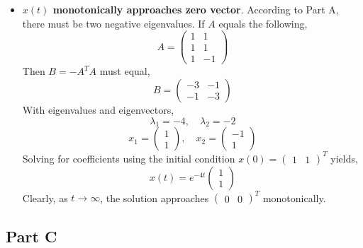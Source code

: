 \documentclass{article}
\begin{document}
\begin{itemize}
  \item {\bf $x(t)$ monotonically approaches zero vector}. According to Part
  A, there must be two negative eigenvalues. If $A$ equals the following,
  $$ A = \begin{pmatrix}
    1 & 1 \\
    1 & 1 \\
    1 & -1
  \end{pmatrix} $$
  Then $B = -A^T A$ must equal,
  $$ B = \begin{pmatrix}
    -3 & -1 \\
    -1 & -3
  \end{pmatrix} $$
  With eigenvalues and eigenvectors,
  $$ \lambda_1 = -4,\quad \lambda_2 = -2 $$
  $$ x_1 = \begin{pmatrix}
    1 \\
    1
  \end{pmatrix},\quad x_2 = \begin{pmatrix}
    -1 \\
    1
  \end{pmatrix} $$
  Solving for coefficients using the initial condition $x(0) =
  \begin{pmatrix} 1 & 1 \end{pmatrix}^T$ yields,
  $$ x(t) = e^{-4 t} \begin{pmatrix}
    1 \\
    1
  \end{pmatrix} $$
  Clearly, as $t \longrightarrow \infty$, the solution approaches
  $\begin{pmatrix} 0 & 0 \end{pmatrix}^T$ monotonically.

\end{itemize}

\subsection*{Part C}
\end{document}
